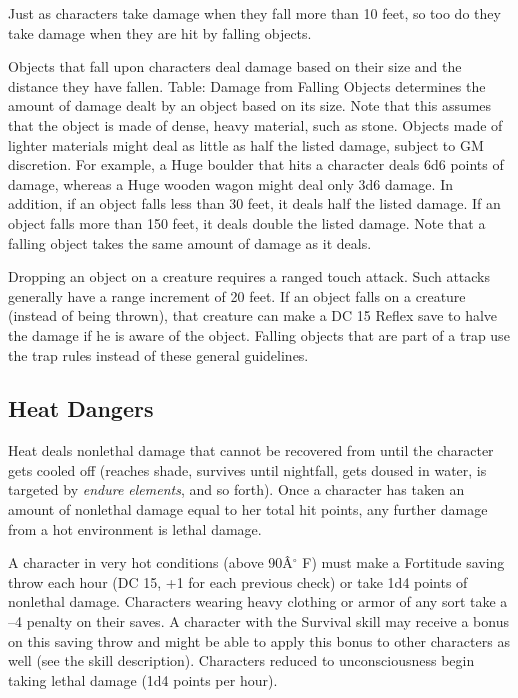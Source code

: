 				
Just as characters take damage when they fall more than 10 feet, so too do they take damage when they are hit by falling objects.
				
Objects that fall upon characters deal damage based on their size and the distance they have fallen. Table: Damage from Falling Objects determines the amount of damage dealt by an object based on its size. Note that this assumes that the object is made of dense, heavy material, such as stone. Objects made of lighter materials might deal as little as half the listed damage, subject to GM discretion. For example, a Huge boulder that hits a character deals 6d6 points of damage, whereas a Huge wooden wagon might deal only 3d6 damage. In addition, if an object falls less than 30 feet, it deals half the listed damage. If an object falls more than 150 feet, it deals double the listed damage. Note that a falling object takes the same amount of damage as it deals.
				
Dropping an object on a creature requires a ranged touch attack. Such attacks generally have a range increment of 20 feet. If an object falls on a creature (instead of being thrown), that creature can make a DC 15 Reflex save to halve the damage if he is aware of the object. Falling objects that are part of a trap use the trap rules instead of these general guidelines.
								
\subsection{Heat Dangers}

				
Heat deals nonlethal damage that cannot be recovered from until the character gets cooled off (reaches shade, survives until nightfall, gets doused in water, is targeted by \textit{endure elements}, and so forth). Once a character has taken an amount of nonlethal damage equal to her total hit points, any further damage from a hot environment is lethal damage.
				
A character in very hot conditions (above 90\^A\mbox{${}^\circ$} F) must make a Fortitude saving throw each hour (DC 15, +1 for each previous check) or take 1d4 points of nonlethal damage. Characters wearing heavy clothing or armor of any sort take a --4 penalty on their saves. A character with the Survival skill may receive a bonus on this saving throw and might be able to apply this bonus to other characters as well (see the skill description). Characters reduced to unconsciousness begin taking lethal damage (1d4 points per hour).
				
